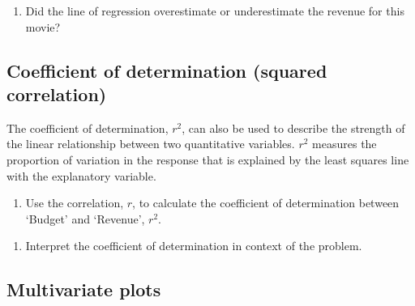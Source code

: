 \documentclass[
]{report}
\providecommand{\tightlist}{%
  \setlength{\itemsep}{0pt}\setlength{\parskip}{0pt}}
\begin{document}
\vspace{.8in}

\begin{enumerate}
\def\labelenumi{\arabic{enumi}.}
\setcounter{enumi}{13}
\tightlist
\item
  Did the line of regression overestimate or underestimate the revenue for this movie?
\end{enumerate}

\vspace{.2in}

\newpage

\hypertarget{coefficient-of-determination-squared-correlation}{%
\subsection*{Coefficient of determination (squared correlation)}\label{coefficient-of-determination-squared-correlation}}

The coefficient of determination, \(r^2\), can also be used to describe the strength of the linear relationship between two quantitative variables. \(r^2\) measures the proportion of variation in the response that is explained by the least squares line with the explanatory variable.

\begin{enumerate}
\def\labelenumi{\arabic{enumi}.}
\setcounter{enumi}{14}
\tightlist
\item
  Use the correlation, \(r\), to calculate the coefficient of determination between `Budget' and `Revenue', \(r^2\).
\end{enumerate}

\vspace{.4in}

\begin{enumerate}
\def\labelenumi{\arabic{enumi}.}
\setcounter{enumi}{15}
\tightlist
\item
  Interpret the coefficient of determination in context of the problem.
\end{enumerate}

\vspace{.6in}

\hypertarget{multivariate-plots}{%
\subsection*{Multivariate plots}\label{multivariate-plots}}
\end{document}
